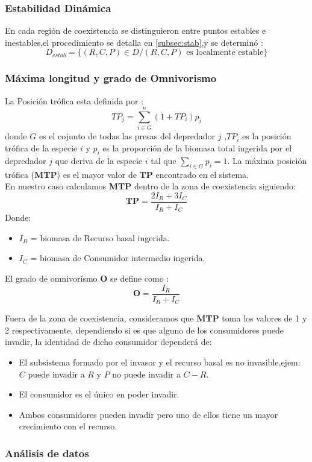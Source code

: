 \subsubsection{Estabilidad Din\'amica}
En cada regi\'on de coexistencia se distinguieron entre puntos estables e inestables,el procedimiento se detalla en \ref{subsec:stab},y se determin\'o :
\begin{equation}\label{eq:estabreg}
D_{estab} = \{ (R,C,P) \in D / (R,C,P) \mbox{ es localmente estable} \}
\end{equation}

\subsubsection{M\'axima longitud y grado de Omnivorismo}
La Posici\'on tr\'ofica esta definida por \citep{TP2007proximate}:
\begin{equation} TP_j = \sum_{i \in G}^n (1+TP_i) p_i  \end{equation} donde $G$ es el cojunto de todas las presas del depredador $j$ ,$TP_i$ es la posici\'on tr\'ofica de la especie $i$ y $p_i$ es la proporci\'on de la biomasa total ingerida por el depredador $j$ que deriva de la especie $i$ tal que $ \sum_{i \in G} p_i =1 $.
La m\'axima posici\'on tr\'ofica (\textbf{MTP}) es el mayor valor de \textbf{TP} encontrado en el sistema.\\


En nuestro caso calculamos \textbf{MTP} dentro de la zona de coexistencia siguiendo:
\begin{equation} \mathbf{TP}= \frac{2 I_R + 3 I_C}{I_R+I_C} \end{equation}
Donde:
\begin{itemize}
\item $I_R$ = biomasa de Recurso basal ingerida.
\item $I_C$ = biomasa de Consumidor intermedio ingerida.
\end{itemize}
El grado de omnivor\'ismo $\mathbf{O}$ se define como \citep{TP2007proximate}:
\begin{equation} \mathbf{O}= \frac{I_R}{I_R+I_C} \end{equation}

Fuera de la zona de coexistencia, consideramos que \textbf{MTP} toma los valores de 1 y 2 respectivamente, dependiendo si es que alguno de los consumidores puede invadir, la identidad de dicho consumidor depender\'a de: 
\begin{itemize}
\item El subsistema formado por el invasor y el recurso basal es no invasible,ejem: $C$ puede invadir a $R$ y $P$ no puede invadir a $C-R$.
\item El consumidor es el \'unico en poder invadir.
\item Ambos consumidores pueden invadir pero uno de ellos tiene un mayor crecimiento con el recurso.
\end{itemize}

\subsubsection{An\'alisis de datos}
